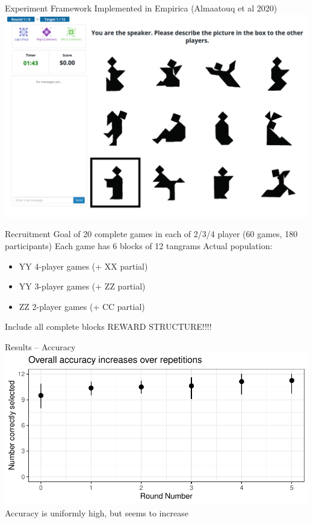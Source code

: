 \documentclass[ 12pt, xcolor=beamer,table,usenames,dvipsnames, ignorenonframetext, ngerman]{beamer}
\begin{document}
\begin{frame}{Experiment Framework}
Implemented in Empirica (Almaatouq et al 2020) 
 \includegraphics[width=.9\textwidth]{../images/interface.PNG}
\end{frame}

\begin{frame}{Recruitment}
	Goal of 20 complete games in each of 2/3/4 player (60 games, 180 participants)
	Each game has 6 blocks of 12 tangrams
	Actual population:
	\begin{itemize}
		\item YY 4-player games (+ XX partial)
		\item YY 3-player games (+ ZZ partial)
		\item ZZ 2-player games (+ CC partial)
	\end{itemize}
Include all complete blocks
REWARD STRUCTURE!!!!
\end{frame}


\begin{frame}{Results -- Accuracy}
	\includegraphics[width=\textwidth]{../images/accuracy.pdf}
	Accuracy is uniformly high, but seems to increase
\end{frame}
\end{document}

